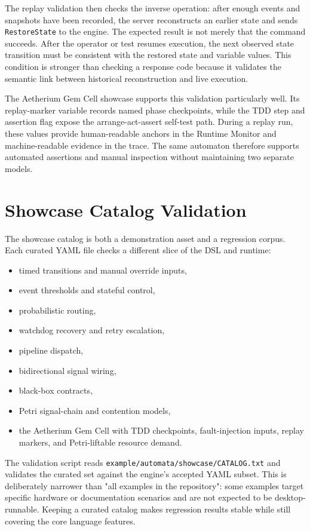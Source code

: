 The replay validation then checks the inverse operation: after enough events and snapshots have been recorded, the server reconstructs an earlier state and sends \texttt{RestoreState} to the engine. The expected result is not merely that the command succeeds. After the operator or test resumes execution, the next observed state transition must be consistent with the restored state and variable values. This condition is stronger than checking a response code because it validates the semantic link between historical reconstruction and live execution.

The Aetherium Gem Cell showcase supports this validation particularly well. Its replay-marker variable records named phase checkpoints, while the TDD step and assertion flag expose the arrange-act-assert self-test path. During a replay run, these values provide human-readable anchors in the Runtime Monitor and machine-readable evidence in the trace. The same automaton therefore supports automated assertions and manual inspection without maintaining two separate models.

\section{Showcase Catalog Validation}

The showcase catalog is both a demonstration asset and a regression corpus. Each curated YAML file checks a different slice of the DSL and runtime:

\begin{itemize}
  \item timed transitions and manual override inputs,
  \item event thresholds and stateful control,
  \item probabilistic routing,
  \item watchdog recovery and retry escalation,
  \item pipeline dispatch,
  \item bidirectional signal wiring,
  \item black-box contracts,
  \item Petri signal-chain and contention models,
  \item the Aetherium Gem Cell with TDD checkpoints, fault-injection inputs, replay markers, and Petri-liftable resource demand.
\end{itemize}

The validation script reads \texttt{example/automata/showcase/CATALOG.txt} and validates the curated set against the engine's accepted YAML subset. This is deliberately narrower than "all examples in the repository": some examples target specific hardware or documentation scenarios and are not expected to be desktop-runnable. Keeping a curated catalog makes regression results stable while still covering the core language features.

